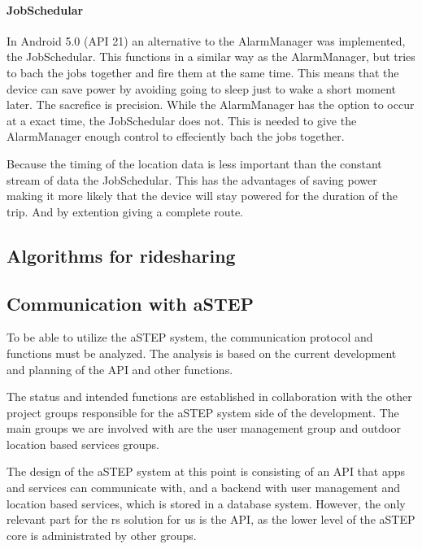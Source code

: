 \paragraph{JobSchedular}
In Android 5.0 (API 21) an alternative to the AlarmManager was implemented, the JobSchedular.
This functions in a similar way as the AlarmManager, but tries to bach the jobs together and fire them at the same time.
This means that the device can save power by avoiding going to sleep just to wake a short moment later.
The sacrefice is precision. 
While the AlarmManager has the option to occur at a exact time, the JobSchedular does not.
This is needed to give the AlarmManager enough control to effeciently bach the jobs together.

 Because the timing of the location data is less important than the constant stream of data the JobSchedular.
This has the advantages of saving power making it more likely that the device will stay powered for the duration of the trip.
And by extention giving a complete route.

\subsection{Algorithms for ridesharing}


\subsection{Communication with aSTEP}
To be able to utilize the aSTEP system, the communication protocol and functions must be analyzed. 
The analysis is based on the current development and planning of the API and other functions.

The status and intended functions are established in collaboration with the other project groups responsible for the aSTEP system side of the development. 
The main groups we are involved with are the user management group and outdoor location based services groups.

The design of the aSTEP system at this point is consisting of an API that apps and services can communicate with, and a backend with user management and location based services, which is stored in a database system.
However, the only relevant part for the \gls{rs} solution for us is the API, as the lower level of the aSTEP core is administrated by other groups.

